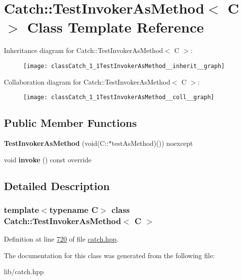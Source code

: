 \hypertarget{classCatch_1_1TestInvokerAsMethod}{}\section{Catch\+::Test\+Invoker\+As\+Method$<$ C $>$ Class Template Reference}
\label{classCatch_1_1TestInvokerAsMethod}


Inheritance diagram for Catch\+::Test\+Invoker\+As\+Method$<$ C $>$\+:\nopagebreak
\begin{figure}[H]
\begin{center}
\leavevmode
\texttt{[image: classCatch\_1\_1TestInvokerAsMethod\_\_inherit\_\_graph]}
\end{center}
\end{figure}


Collaboration diagram for Catch\+::Test\+Invoker\+As\+Method$<$ C $>$\+:\nopagebreak
\begin{figure}[H]
\begin{center}
\leavevmode
\texttt{[image: classCatch\_1\_1TestInvokerAsMethod\_\_coll\_\_graph]}
\end{center}
\end{figure}
\subsection*{Public Member Functions}
\begin{DoxyCompactItemize}
\item 
\mbox{\label{classCatch_1_1TestInvokerAsMethod_a119c4bdbbdd95c42859c18541987a1a4}} 
{\bfseries Test\+Invoker\+As\+Method} (void(C\+::$\ast$test\+As\+Method)()) noexcept
\item 
\mbox{\label{classCatch_1_1TestInvokerAsMethod_a8115a06efe273f4112ec0b5452c1b5f2}} 
void {\bfseries invoke} () const override
\end{DoxyCompactItemize}


\subsection{Detailed Description}
\subsubsection*{template$<$typename C$>$\newline
class Catch\+::\+Test\+Invoker\+As\+Method$<$ C $>$}



Definition at line \mbox{\hyperlink{catch_8hpp_source_l00720}{720}} of file \mbox{\hyperlink{catch_8hpp_source}{catch.\+hpp}}.



The documentation for this class was generated from the following file\+:\begin{DoxyCompactItemize}
\item 
lib/catch.\+hpp\end{DoxyCompactItemize}
